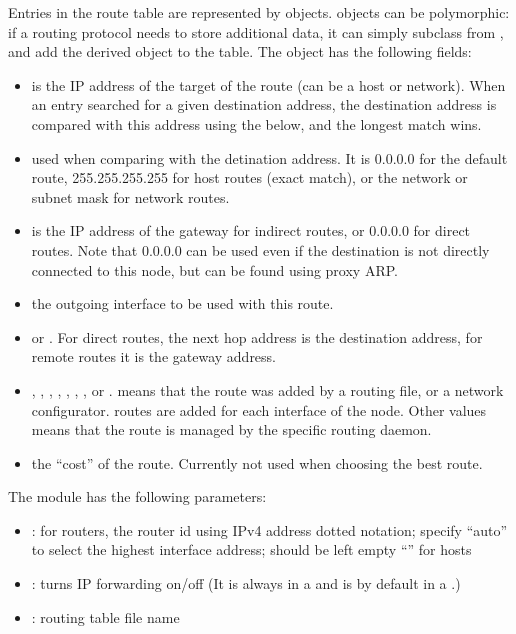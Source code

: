 Entries in the route table are represented by  objects.
 objects can be polymorphic: if a routing protocol needs
to store additional data, it can simply subclass from ,
and add the derived object to the table. The  object
has the following fields:
\begin{itemize}
  \item {} is the IP address of the target of the route (can be a host or network).
                   When an entry searched for a given destination address, the destination
                   address is compared with this  address using the 
                   below, and the longest match wins.
  \item {} used when comparing  with the detination address.
                     It is 0.0.0.0 for the default route, 255.255.255.255 for
                     host routes (exact match), or the network or subnet mask
                     for network routes.
  \item {} is the IP address of the gateway for indirect routes, or
                      0.0.0.0 for direct routes. Note that 0.0.0.0 can be used
                      even if the destination is not directly connected to this
                      node, but can be found using proxy ARP. 
  \item {} the outgoing interface to be used with this route.
  \item {}  or . For direct routes, the next hop
                   address is the destination address, for remote routes it is
                   the gateway address.
  \item {} , , , ,
        , , , or .  means
        that the route was added by a routing file, or a network configurator.
         routes are added for each interface of the node.
        Other values means that the route is managed by the specific routing
        daemon.
  \item {} the ``cost'' of the route. Currently not used when choosing
                     the best route.
\end{itemize}

The  module has the following parameters:

\begin{itemize}
  \item {}: for routers, the router id using IPv4 address dotted notation;
        specify ``auto'' to select the highest interface address; should be left empty ``''
        for hosts
  \item {}: turns IP forwarding on/off (It is always 
                          in a  and is  by default
                          in a .)
  \item {}: routing table file name
\end{itemize}

